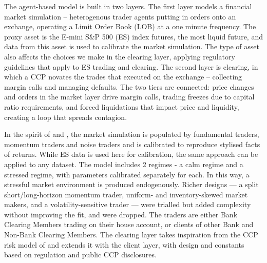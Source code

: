
The agent-based model is built in two layers. The first layer models a financial market simulation -- heterogenous trader agents putting in orders onto an exchange, operating a Limit Order Book (LOB) at a one minute frequency. The proxy asset is the E-mini S\&P 500 (ES) index futures, the most liquid future, and data from this asset is used to calibrate the market simulation. The type of asset also affects the choices we make in the clearing layer, applying regulatory guidelines that apply to ES trading and clearing. The second layer is clearing, in which a CCP novates the trades that executed on the exchange -- collecting margin calls and managing defaults. The two tiers are connected: price changes and orders in the market layer drive margin calls, trading freezes due to capital ratio requirements, and forced liquidations that impact price and liquidity, creating a loop that spreads contagion. 

In the spirit of \cite{chiarella_iori_perello_2009} and \cite{majewski_2018}, the market simulation is populated by fundamental traders, momentum traders and noise traders and is calibrated to reproduce stylised facts of returns. While ES data is used here for calibration, the same approach can be applied to any dataset. The model includes 2 regimes - a calm regime and a stressed regime, with parameters calibrated separately for each. In this way, a stressful market environment is produced endogenously. 
Richer designs --- a split short/long-horizon momentum trader, uniform- and inventory-skewed market makers,
and a volatility-sensitive trader --- were trialled but added complexity without improving the fit,
and were dropped.  The traders are either Bank Clearing Members trading on their house account, or clients of other Bank and Non-Bank Clearing Members. The clearing layer takes inspiration from the CCP risk model of \cite{deloitte_ccp} and extends it with the client layer, with design and constants based on regulation and public CCP disclosures. 


